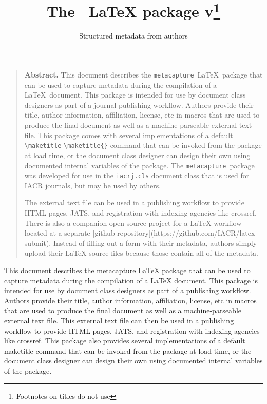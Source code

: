 \documentclass{article}
\date{\METAC@filedate}
\title[plaintext={The metacapture LaTeX package},
       running={The \pkgname\ \LaTeX\ package v\pkgversion},
      ]{The \pkgname\ \textrm{\LaTeX} package v\pkgversion\footnote{Footnotes on titles do not use \cmd{thanks}}}
\subtitle[plaintext={Structured metadata from authors}]{Structured metadata from authors}
\newcommand{\pkgname}{\texttt{metacapture}}
\newcommand{\cmd}[2][]{%
  \def\FirstArg{#1}%
  \ifx\FirstArg\empty%
    \texttt{\textbackslash{}#2}%
  \else%
    \texttt{\textbackslash{}#2\{#1\}}%
  \fi
}
\begin{document}
\hypersetup{colorlinks=true}
\maketitle
\renewenvironment{abstract}{\begin{quote}\noindent\textbf{\textsf{Abstract.}}}{\end{quote}}
\begin{abstract}
  This document describes the \pkgname\ \LaTeX\ package that can be
  used to capture metadata during the compilation of a \LaTeX\
  document. This package is intended for use by document class
  designers as part of a journal publishing workflow. Authors provide
  their title, author information, affiliation, license, etc in macros
  that are used to produce the final document as well as a
  machine-parseable external text file. This package comes with
  several implementations of a default \cmd{maketitle} command that
  can be invoked from the package at load time, or the document class
  designer can design their own using documented internal variables of
  the package. The \pkgname\ package was developed for use in
  the \texttt{iacrj.cls} document class that is used for IACR
  journals, but may be used by others.


  The external text file can be used in a publishing workflow to
  provide HTML pages, JATS, and registration with indexing agencies
  like crossref. There is also a companion open source project for a LaTeX
  workflow located at a separate [github
  repository](https://github.com/IACR/latex-submit).  Instead of filling
  out a form with their metadata, authors simply upload their LaTeX
  source files because those contain all of the metadata.
\end{abstract}
\begin{textabstract}
  This document describes the metacapture LaTeX package that can
  be used to capture metadata during the compilation of a LaTeX
  document. This package is intended for use by document class
  designers as part of a publishing workflow. Authors provide their
  title, author information, affiliation, license, etc in macros that
  are used to produce the final document as well as a
  machine-parseable external text file.  This external text file can
  then be used in a publishing workflow to provide HTML pages, JATS, and
  registration with indexing agencies like crossref. This package also
  provides several implementations of a default maketitle command that
  can be invoked from the package at load time, or the document class
  designer can design their own using documented internal variables of
  the package.
\end{textabstract}
\end{document}
